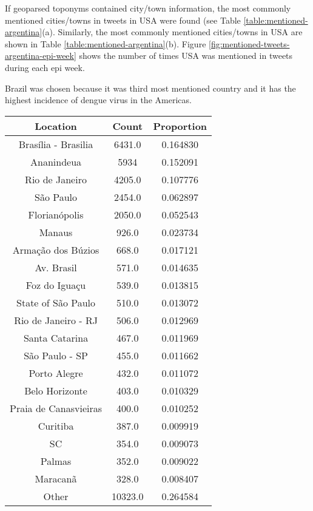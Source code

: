 If geoparsed toponyms contained city/town information, the most commonly mentioned cities/towns in tweets in USA were found (see Table \ref{table:mentioned-argentina}(a).
Similarly, the most commonly mentioned cities/towns in USA are shown in Table \ref{table:mentioned-argentina}(b).
Figure \ref{fig:mentioned-tweets-argentina-epi-week} shows the number of times USA was mentioned in tweets during each epi week.

Brazil was chosen because it was third most mentioned country and it has the highest incidence of dengue virus in the Americas.

\begin{table}
\centering
\begin{subtable}[c]{0.5\textwidth}
\centering
\begin{tabular}{|c|c|c|}
\hline
    \textbf{Location} & \textbf{Count} & \textbf{Proportion} \\
    \hline
    Brasília - Brasilia & 6431.0 & 0.164830 \\
    Ananindeua & 5934 & 0.152091 \\
    Rio de Janeiro & 4205.0 & 0.107776 \\
    São Paulo & 2454.0 & 0.062897 \\
    Florianópolis & 2050.0 & 0.052543 \\
    Manaus & 926.0 & 0.023734 \\
    Armação dos Búzios & 668.0 & 0.017121 \\
    Av. Brasil & 571.0 & 0.014635 \\
    Foz do Iguaçu & 539.0 & 0.013815 \\
    State of São Paulo & 510.0 & 0.013072 \\
    Rio de Janeiro - RJ & 506.0 & 0.012969 \\
    Santa Catarina & 467.0 & 0.011969 \\
    São Paulo - SP & 455.0 & 0.011662 \\
    Porto Alegre & 432.0 & 0.011072 \\
    Belo Horizonte & 403.0 & 0.010329 \\
    Praia de Canasvieiras & 400.0 & 0.010252 \\
    Curitiba & 387.0 & 0.009919 \\
    SC & 354.0 & 0.009073 \\
    Palmas & 352.0 & 0.009022 \\
    Maracanã & 328.0 & 0.008407 \\
    Other & 10323.0 & 0.264584 \\
    \hline
    \end{tabular}
\end{subtable}


\end{table}
